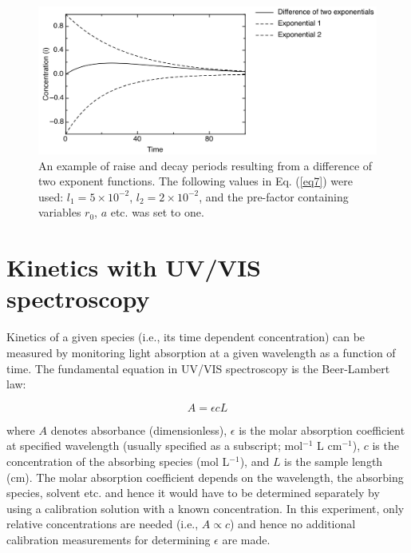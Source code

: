 \documentclass[byrevtex,amssymb,aps,pra,floatfix,letterpaper]{revtex4}
\begin{document}
\begin{figure}[!htp]
\begin{center}
\includegraphics[scale=0.5]{fig4}
\caption{An example of raise and decay periods resulting from a difference of two exponent functions. The following values in Eq. (\ref{eq7}) were used: $l_1 = 5 \times 10^{-2}$, $l_2 = 2 \times 10^{-2}$, and the pre-factor containing variables $r_0$, $a$ etc. was set to one.}
\label{fig4}
\end{center}
\end{figure}

\section{Kinetics with UV/VIS spectroscopy}

Kinetics of a given species (i.e., its time dependent concentration) can be measured by monitoring light absorption at a given wavelength as a function of time. The fundamental equation in UV/VIS spectroscopy is the Beer-Lambert law:

\begin{equation}
\label{eq10}
A = \epsilon c L
\end{equation}

\noindent
where $A$ denotes absorbance (dimensionless), $\epsilon$ is the molar absorption coefficient at specified wavelength (usually specified as a subscript; mol$^{-1}$ L cm$^{-1}$), $c$ is the concentration of the absorbing species (mol L$^{-1}$), and $L$ is the sample length (cm). The molar absorption coefficient depends on the wavelength, the absorbing species, solvent etc. and hence it would have to be determined separately by using a calibration solution with a known concentration.  In this experiment, only relative concentrations are needed (i.e., $A \propto c$) and hence no additional calibration measurements for determining $\epsilon$ are made.
\end{document}
